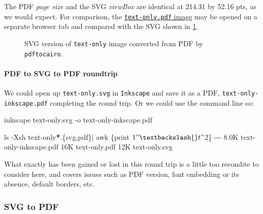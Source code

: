 \documentclass[
  a4paper,
]{article}
\newenvironment{Shaded}{\begin{snugshade}}{\end{snugshade}}
\newcommand{\AttributeTok}[1]{\textcolor[rgb]{0.80,0.80,0.80}{#1}}
\newcommand{\DataTypeTok}[1]{\textcolor[rgb]{0.87,0.87,0.75}{#1}}
\newcommand{\ExtensionTok}[1]{\textcolor[rgb]{0.80,0.80,0.80}{#1}}
\newcommand{\FunctionTok}[1]{\textcolor[rgb]{0.94,0.94,0.56}{#1}}
\newcommand{\KeywordTok}[1]{\textcolor[rgb]{0.94,0.87,0.69}{#1}}
\newcommand{\NormalTok}[1]{\textcolor[rgb]{0.80,0.80,0.80}{#1}}
\newcommand{\OperatorTok}[1]{\textcolor[rgb]{0.94,0.94,0.82}{#1}}
\newcommand{\PreprocessorTok}[1]{\textcolor[rgb]{1.00,0.81,0.69}{\textbf{#1}}}
\newcommand{\StringTok}[1]{\textcolor[rgb]{0.80,0.58,0.58}{#1}}
\begin{document}
The PDF \emph{page size} and the SVG \emph{viewBox} are identical at
214.31 by 52.16 pts, as we would expect. For comparison, the
\href{images/text-only.pdf}{\texttt{text-only.pdf} image} may be opened
on a separate browser tab and compared with the SVG shown in
\cref{fig:SVGfromPDFviapdftocairo}.

\begin{figure}
\hypertarget{fig:SVGfromPDFviapdftocairo}{%
\centering

\caption{SVG version of \texttt{text-only} image converted from PDF by
\texttt{pdftocairo}.}\label{fig:SVGfromPDFviapdftocairo}
}
\end{figure}

\hypertarget{pdf-to-svg-to-pdf-roundtrip}{%
\paragraph{PDF to SVG to PDF
roundtrip}\label{pdf-to-svg-to-pdf-roundtrip}}

We could open up \texttt{text-only.svg} in \texttt{Inkscape} and save it
as a PDF, \texttt{text-only-inkscape.pdf} completing the round trip. Or
we could use the command line so:

\begin{Shaded}
\begin{Highlighting}[]
\ExtensionTok{inkscape}\NormalTok{ text{-}only.svg }\AttributeTok{{-}o}\NormalTok{ text{-}only{-}inkscape.pdf}

\FunctionTok{ls} \AttributeTok{{-}Xsh}\NormalTok{ text{-}only}\PreprocessorTok{*}\NormalTok{.}\DataTypeTok{\{svg}\OperatorTok{,}\DataTypeTok{pdf\}}\KeywordTok{|} \FunctionTok{awk} \StringTok{\textquotesingle{}\{print $1 "\textbackslash{}t" $2\}\textquotesingle{}}
\ExtensionTok{{-}{-}{-}}
\ExtensionTok{8.0K}\NormalTok{    text{-}only{-}inkscape.pdf}
\ExtensionTok{16K}\NormalTok{     text{-}only.pdf}
\ExtensionTok{12K}\NormalTok{     text{-}only.svg}
\end{Highlighting}
\end{Shaded}

What exactly has been gained or lost in this round trip is a little too
recondite to consider here, and covers issues such as PDF version, font
embedding or its absence, default borders, etc.

\hypertarget{svg-to-pdf}{%
\subsubsection{SVG to PDF}\label{svg-to-pdf}}
\end{document}
